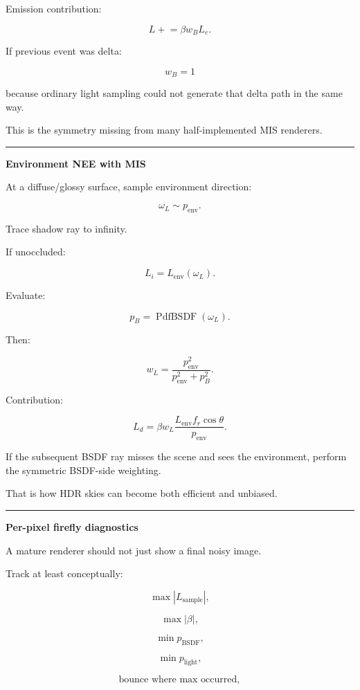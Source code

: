 Emission contribution:

\[
\boxed{
L
\mathrel{+}=
\beta
w_B
L_e.
}
\]

If previous event was delta:

\[
w_B=1
\]

because ordinary light sampling could not generate that delta path in the same way.

This is the symmetry missing from many half-implemented MIS renderers.

\begin{center}\rule{0.5\linewidth}{0.5pt}\end{center}

\textbf{Environment NEE with MIS}

At a diffuse/glossy surface, sample environment direction:

\[
\omega_L
\sim
p_{\text{env}}.
\]

Trace shadow ray to infinity.

If unoccluded:

\[
L_i=
L_{\text{env}}(\omega_L).
\]

Evaluate:

\[
p_B=
\operatorname{PdfBSDF}(\omega_L).
\]

Then:

\[
w_L
=
\frac{
p_{\text{env}}^2
}{
p_{\text{env}}^2+p_B^2
}.
\]

Contribution:

\[
\boxed{
L_d
=
\beta
w_L
\frac{
L_{\text{env}}
f_r
\cos\theta
}{
p_{\text{env}}
}.
}
\]

If the subsequent BSDF ray misses the scene and sees the environment, perform the symmetric BSDF-side weighting.

That is how HDR skies can become both efficient and unbiased.

\begin{center}\rule{0.5\linewidth}{0.5pt}\end{center}

\textbf{Per-pixel firefly diagnostics}

A mature renderer should not just show a final noisy image.

Track at least conceptually:

\[
\max |L_{\text{sample}}|,
\]

\[
\max |\beta|,
\]

\[
\min p_{\text{BSDF}},
\]

\[
\min p_{\text{light}},
\]

\[
\text{bounce where max occurred},
\]

